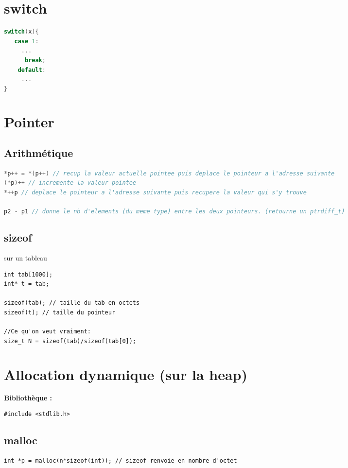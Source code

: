 \documentclass[8pt]{article}
\begin{document}
\begin{multicols}{2}

\section{switch}
\begin{lstlisting}[language=C]
switch(x){
   case 1:
     ...
      break;
    default:
     ...
}
\end{lstlisting}

\section{Pointer}
\subsection{Arithmétique}
\begin{lstlisting}[language=C]
*p++ = *(p++) // recup la valeur actuelle pointee puis deplace le pointeur a l'adresse suivante 
(*p)++ // incremente la valeur pointee
*++p // deplace le pointeur a l'adresse suivante puis recupere la valeur qui s'y trouve

p2 - p1 // donne le nb d'elements (du meme type) entre les deux pointeurs. (retourne un ptrdiff_t)
\end{lstlisting}

\subsection{sizeof}
sur un tableau
\begin{lstlisting}
int tab[1000];
int* t = tab;

sizeof(tab); // taille du tab en octets
sizeof(t); // taille du pointeur

//Ce qu'on veut vraiment:
size_t N = sizeof(tab)/sizeof(tab[0]);
\end{lstlisting}

\section{Allocation dynamique (sur la heap)}

{\small\textbf{Bibliothèque :}}
\begin{lstlisting}
#include <stdlib.h>
\end{lstlisting}

\subsection{malloc}
\begin{lstlisting}
int *p = malloc(n*sizeof(int)); // sizeof renvoie en nombre d'octet
\end{lstlisting}


\end{multicols}
\end{document}
